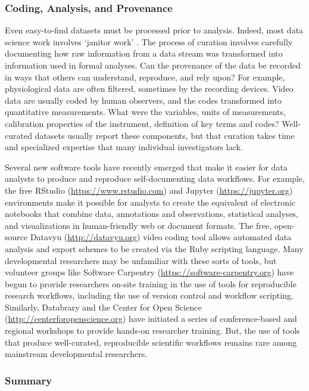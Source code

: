 \documentclass[letterpaper,man,apacite]{apa6}
\begin{document}
\subsubsection{Coding, Analysis, and Provenance}

Even easy-to-find datasets must be processed prior to analysis.
Indeed, most data science work involves `janitor work' \cite{lohr_for_2014}.
The process of curation involves carefully documenting how raw information from a data stream was transformed into information used in formal analyses. 
Can the provenance of the data be recorded in ways that others can understand, reproduce, and rely upon?
For example, physiological data are often filtered, sometimes by the recording devices.
Video data are usually coded by human observers, and the codes transformed into quantitative measurements.
What were the variables, units of measurements, calibration properties of the instrument, definition of key terms and codes?
Well-curated datasets usually report these components, but that curation takes time and specialized expertise that many individual investigators lack.

Several new software tools have recently emerged that make it easier for data analysts to produce and reproduce self-documenting data workflows.
For example, the free RStudio (\url{https://www.rstudio.com}) and Jupyter (\url{https://jupyter.org}) environments make it possible for analysts to create the equivalent of electronic notebooks that combine data, annotations and observations, statistical analyses, and visualizations in human-friendly web or document formats.
The free, open-source Datavyu (\url{http://datavyu.org}) video coding tool allows automated data analysis and export schemes to be created via the Ruby scripting language.
Many developmental researchers may be unfamiliar with these sorts of tools, but volunteer groups like Software Carpentry (\url{https://software-carpentry.org}) have begun to provide researchers on-site training in the use of tools for reproducible research workflows, including the use of version control and workflow scripting.
Similarly, Databrary and the Center for Open Science (\url{http://centerforopenscience.org}) have initiated a series of conference-based and regional workshops to provide hands-on researcher training.
But, the use of tools that produce well-curated, reproducible scientific workflows remains rare among mainstream developmental researchers.

\subsubsection{Summary}
\end{document}
